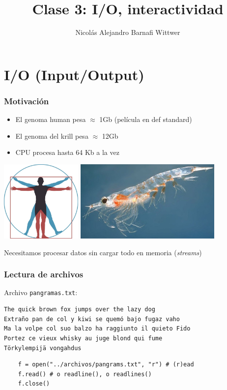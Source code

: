 \documentclass[14pt,aspectratio=169,xcolor=dvipsnames]{beamer}
\title[short title]{Clase 3: I/O, interactividad}
\subtitle{}
\author[NA Barnafi] {Nicolás Alejandro Barnafi Wittwer}
\institute[UC|CMM] 
{
    Pontificia Universidad Católica de Chile \\
    Centro de Modelamiento Matemático
}
\date{}
\begin{document}
\begin{frame}
    \maketitle
\end{frame}
\section{I/O (Input/Output)}
\begin{frame}\frametitle{Motivación}
    \begin{itemize}
        \item El genoma human pesa $\approx$ 1Gb (película en def standard)
        \item El genoma del krill pesa $\approx$ 12Gb
        \item CPU procesa hasta 64 Kb a la vez
    \end{itemize}
    \hspace{2cm}\includegraphics[height=4cm]{../images/vitruvio.jpg}
    \includegraphics[height=4cm]{../images/krill.jpg}

\pause Necesitamos procesar datos sin cargar todo en memoria (\emph{streams})
\end{frame}
\begin{frame}[fragile]\frametitle{Lectura de archivos}
Archivo \texttt{pangramas.txt}:
    \begin{verbatim}
The quick brown fox jumps over the lazy dog
Extraño pan de col y kiwi se quemó bajo fugaz vaho
Ma la volpe col suo balzo ha raggiunto il quieto Fido
Portez ce vieux whisky au juge blond qui fume
Törkylempijä vongahdus
    \end{verbatim}

    \begin{verbatim}
    f = open("../archivos/pangrams.txt", "r") # (r)ead
    f.read() # o readline(), o readlines()
    f.close()
    \end{verbatim}
\end{frame}
\end{document}
